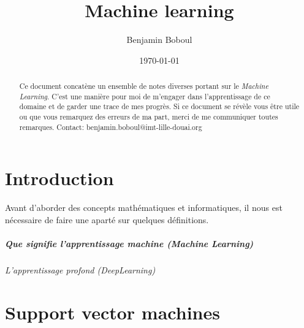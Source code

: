 \documentclass{report}
\title{Machine learning}
\author{Benjamin Boboul}
\date{\today}
\begin{document}
	\maketitle

	\begin{abstract}
	Ce document concatène un ensemble de notes diverses portant sur le \textit{Machine Learning}.
	C'est une manière pour moi de m'engager dans l'apprentissage de ce domaine et de garder une trace de mes progrès.
	Si ce document se révèle vous être utile ou que vous remarquez des erreurs de ma part, merci de me communiquer toutes remarques.
	Contact: benjamin.boboul@imt-lille-douai.org
	\end{abstract}

	\chapter{Introduction}
	Avant d'aborder des concepts mathématiques et informatiques, il nous est nécessaire de faire une aparté sur quelques définitions.

	\paragraph{Que signifie l'apprentissage machine (Machine Learning)}

	\subparagraph{L'apprentissage profond (DeepLearning)}

	\chapter{Support vector machines}
	
	
	
	

	\tableofcontents
	\printglossaries
\end{document}
